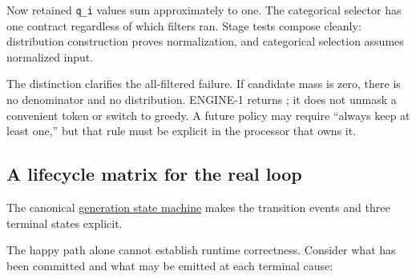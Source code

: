\documentclass[
  10pt,
]{article}
\begin{document}
Now retained \texttt{q\_i} values sum approximately to one. The
categorical selector has one contract regardless of which filters ran.
Stage tests compose cleanly: distribution construction proves
normalization, and categorical selection assumes normalized input.

The distinction clarifies the all-filtered failure. If candidate mass is
zero, there is no denominator and no distribution. ENGINE-1 returns
\texttt{}; it does not unmask a
convenient token or switch to greedy. A future policy may require
``always keep at least one,'' but that rule must be explicit in the
processor that owns it.

\subsection{A lifecycle matrix for the real
loop}\label{a-lifecycle-matrix-for-the-real-loop}

The canonical
\href{https://github.com/hermonai/inside-the-llm-engine/blob/astra-visual-rewrite/diagrams/sampling/generation-terminal-state-machine.txt}{generation
state machine} makes the transition events and three terminal states
explicit.

The happy path alone cannot establish runtime correctness. Consider what
has been committed and what may be emitted at each terminal cause:
\end{document}
